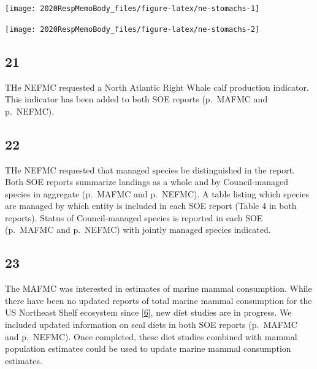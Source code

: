 \documentclass[
  10pt,
]{article}
\let\origfigure\figure
\let\endorigfigure\endfigure
\renewenvironment{figure}[1][2] {
    \expandafter\origfigure\expandafter[H]
} {
    \endorigfigure
}
\begin{document}
\begin{figure}

{\centering \texttt{[image: 2020RespMemoBody\_files/figure-latex/ne-stomachs-1]} 

}

\caption{ Stomach Fullness Anomaly in New England.}\label{fig:ne-stomachs1}
\end{figure}
\begin{figure}

{\centering \texttt{[image: 2020RespMemoBody\_files/figure-latex/ne-stomachs-2]} 

}

\caption{ Stomach Fullness Anomaly in New England.}\label{fig:ne-stomachs2}
\end{figure}

\hypertarget{section-20}{%
\subsection{21}\label{section-20}}

THe NEFMC requested a North Atlantic Right Whale calf production
indicator. This indicator has been added to both SOE reports (p.~MAFMC
and p.~NEFMC).

\hypertarget{section-21}{%
\subsection{22}\label{section-21}}

THe NEFMC requested that managed species be distinguished in the report.
Both SOE reports summarize landings as a whole and by Council-managed
species in aggregate (p.~MAFMC and p.~NEFMC). A table listing which
species are managed by which entity is included in each SOE report
(Table 4 in both reports). Status of Council-managed species is reported
in each SOE (p.~MAFMC and p.~NEFMC) with jointly managed species
indicated.

\hypertarget{section-22}{%
\subsection{23}\label{section-22}}

The MAFMC was interested in estimates of marine mammal consumption.
While there have been no updated reports of total marine mammal
consumption for the US Northeast Shelf ecosystem since
{[}\protect\hyperlink{ref-smith_consumption_2015}{6}{]}, new diet
studies are in progress. We included updated information on seal diets
in both SOE reports (p.~MAFMC and p.~NEFMC). Once completed, these diet
studies combined with mammal population estimates could be used to
update marine mammal consumption estimates.
\end{document}
